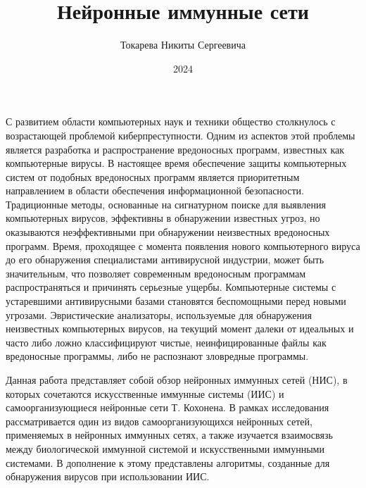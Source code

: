 \documentclass[bachelor, och, referat]{template}
\begin{document}
\title{Нейронные иммунные сети}





\author{Токарева Никиты Сергеевича}




\date{2024}

\maketitle



\tableofcontents

\intro
С развитием области компьютерных наук и техники общество столкнулось с 
возрастающей проблемой киберпреступности. Одним из аспектов этой проблемы 
является разработка и распространение вредоносных программ, известных как 
компьютерные вирусы. В настоящее время обеспечение защиты компьютерных 
систем от подобных вредоносных программ является приоритетным направлением 
в области обеспечения информационной безопасности. Традиционные методы, 
основанные на сигнатурном поиске для выявления компьютерных вирусов, 
эффективны в обнаружении известных угроз, но оказываются неэффективными 
при обнаружении неизвестных вредоносных программ. Время, проходящее с 
момента появления нового компьютерного вируса до его обнаружения 
специалистами антивирусной индустрии, может быть значительным, 
что позволяет современным вредоносным программам распространяться 
и причинять серьезные ущербы. Компьютерные системы с устаревшими 
антивирусными базами становятся беспомощными перед новыми угрозами. 
Эвристические анализаторы, используемые для обнаружения неизвестных 
компьютерных вирусов, на текущий момент далеки от идеальных и часто 
либо ложно классифицируют чистые, неинфицированные файлы как вредоносные 
программы, либо не распознают зловредные программы.

Данная работа представляет собой обзор нейронных иммунных сетей (НИС), в 
которых сочетаются искусственные иммунные системы (ИИС) и самоорганизующиеся 
нейронные сети Т. Кохонена. В рамках исследования рассматривается один из 
видов самоорганизующихся нейронных сетей, применяемых в нейронных иммунных 
сетях, а также изучается взаимосвязь между биологической иммунной системой 
и искусственными иммунными системами. В дополнение к этому представлены 
алгоритмы, созданные для обнаружения вирусов при использовании ИИС.
\end{document}
